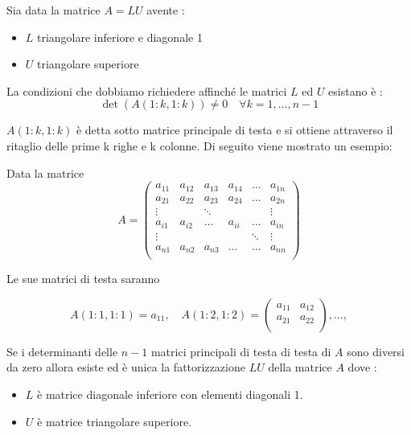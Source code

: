 \documentclass[12pt, a4paper]{book}
\theoremstyle{definition}
\begin{document}
\begin{flushleft}

Sia data la matrice $A = LU$  avente : 

\begin{itemize}
	\item $L$ triangolare inferiore e diagonale 1 
	\item $U$ triangolare superiore
\end{itemize}

La condizioni che dobbiamo richiedere affinché le matrici $L$ ed $U$ esistano è :
\[
	\det(A(1:k, 1:k)) \neq 0 \quad \forall k = 1, \dots, n-1
\]

$A(1:k, 1:k)$ è detta sotto matrice principale di testa e si ottiene attraverso il ritaglio delle prime k righe e k colonne. Di seguito viene mostrato un esempio: 

Data la matrice 
\[
	A = 
	\begin{pmatrix}
		a_{11} & a_{12} & a_{13} & a_{14} & \dots & a_{1n} \\
		a_{21} & a_{22} & a_{23} & a_{24} & \dots & a_{2n} \\
		\vdots & & \ddots &  & & \vdots \\
		a_{i1} & a_{i2} & \dots & a_{ii} & \dots & a_{in} \\
		\vdots & & & & \ddots &   \vdots \\
		a_{n1} & a_{n2} & a_{n3} & \dots &  \dots & a_{nn} \\
	\end{pmatrix}
\]

Le sue matrici di testa saranno

\[ 
	A(1:1, 1:1) = a_{11},
	\quad
	A(1:2, 1:2) = 
	\begin{pmatrix}
		a_{11} & a_{12} \\
		a_{21} & a_{22} \\
	\end{pmatrix},
	\dots
	,
\]

Se i determinanti delle $n-1$ matrici principali di testa di testa di $A$ sono diversi da zero  allora esiste ed è unica la fattorizzazione $LU$  della matrice $A$ dove :
\begin{itemize}
	\item $L$ è matrice diagonale inferiore con elementi diagonali 1.
	\item $U$ è matrice triangolare superiore.
\end{itemize}


\end{flushleft}
\end{document}
